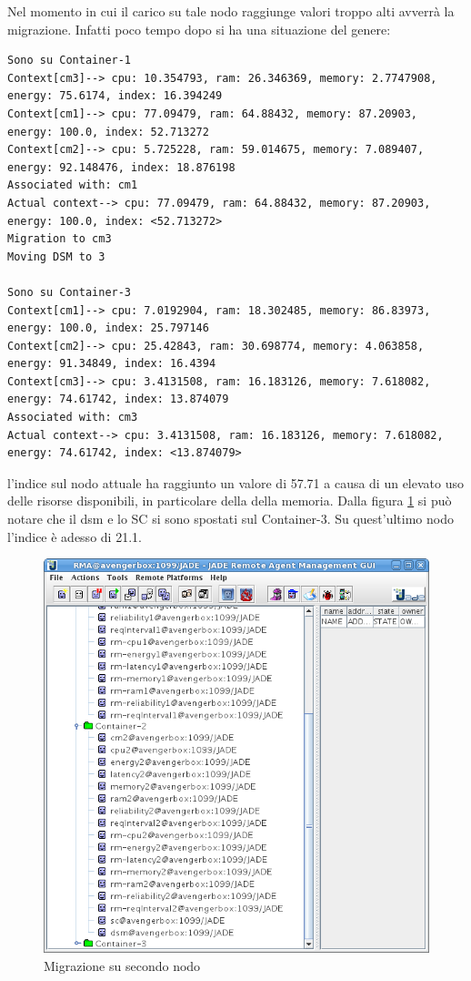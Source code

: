 Nel momento in cui il carico su tale nodo raggiunge valori troppo alti avverrà la migrazione. Infatti poco tempo dopo si ha una situazione del genere:
\begin{lstlisting}
Sono su Container-1
Context[cm3]--> cpu: 10.354793, ram: 26.346369, memory: 2.7747908, energy: 75.6174, index: 16.394249
Context[cm1]--> cpu: 77.09479, ram: 64.88432, memory: 87.20903, energy: 100.0, index: 52.713272
Context[cm2]--> cpu: 5.725228, ram: 59.014675, memory: 7.089407, energy: 92.148476, index: 18.876198
Associated with: cm1
Actual context--> cpu: 77.09479, ram: 64.88432, memory: 87.20903, energy: 100.0, index: <52.713272>
Migration to cm3
Moving DSM to 3

Sono su Container-3
Context[cm1]--> cpu: 7.0192904, ram: 18.302485, memory: 86.83973, energy: 100.0, index: 25.797146
Context[cm2]--> cpu: 25.42843, ram: 30.698774, memory: 4.063858, energy: 91.34849, index: 16.4394
Context[cm3]--> cpu: 3.4131508, ram: 16.183126, memory: 7.618082, energy: 74.61742, index: 13.874079
Associated with: cm3
Actual context--> cpu: 3.4131508, ram: 16.183126, memory: 7.618082, energy: 74.61742, index: <13.874079>
\end{lstlisting}
l'indice sul nodo attuale ha raggiunto un valore di 57.71 a causa di un elevato uso delle risorse disponibili, in particolare della della memoria. Dalla figura \ref{fig:secondo} si può notare che il dsm e lo SC si sono spostati sul Container-3. Su quest'ultimo nodo l'indice è adesso di 21.1.
\begin{figure}[H]
\begin{center}
\includegraphics[scale=0.5]{etc/secondo.png}
\caption{Migrazione su secondo nodo}
\label{fig:secondo}
\end{center}
\end{figure}
